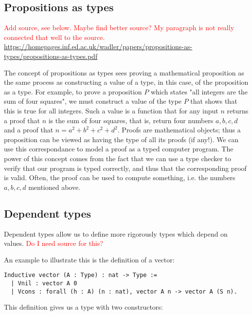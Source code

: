 \subsection{Propositions as types}
\label{ssec:pat}

\textcolor{red}{Add source, see below. Maybe find better source? My paragraph is not really connected that well to the source.}
\url{https://homepages.inf.ed.ac.uk/wadler/papers/propositions-as-types/propositions-as-types.pdf}

The concept of propositions as types sees proving a mathematical proposition
as the same process as constructing a value of a type, in this case,
of the proposition as a type.
For example, to prove a proposition $P$ which states "all integers are the sum of four squares",
we must construct a value of the type $P$ that shows that this is true for all integers.
Such a value is a function that for any input $n$ returns a proof that $n$ is the sum of four squares,
that is, return four numbers $a, b, c, d$ and a proof that $n = a^2 + b^2 + c^2 + d^2$.
Proofs are mathematical objects; thus a proposition can be viewed as having the type of all its proofs (if any!).
We can use this correspondance to model a proof as a typed computer program.
The power of this concept comes from the fact that we can use a type checker to verify that
our program is typed correctly, and thus that the corresponding proof is valid.
Often, the proof can be used to compute something, i.e. the numbers $a, b, c, d$ mentioned above.

\subsection{Dependent types}

Dependent types allow us to define more rigorously types which depend on values.
\textcolor{red}{Do I need source for this?}

An example to illustrate this is the definition of a vector:

\begin{minipage}{\linewidth}
\begin{lstlisting}[language=Coq, label={lst:dep_type_vec}, caption={\lstinline{vector} in Coq, using dependent types}]
Inductive vector (A : Type) : nat -> Type :=
  | Vnil : vector A 0
  | Vcons : forall (h : A) (n : nat), vector A n -> vector A (S n).
\end{lstlisting}
\end{minipage}

This definition gives us a type with two constructors:

